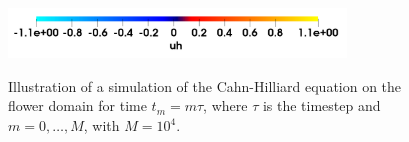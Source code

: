 \documentclass[11pt]{article}
\theoremstyle{remark}
\numberwithin{equation}{section}
\begin{document}
\begin{figure}[]
{    }\hfill
    \\
    \vspace{10pt}
    \hfill
    \hfill
    \hfill
    \vspace{10pt}
        \includegraphics[width=0.8\textwidth]{results/illustration/colobar.png}
        \caption{Illustration of a simulation of the Cahn-Hilliard equation on the flower domain for time $ t_{m} = m\tau $, where $\tau $ is the timestep and $m= 0,\ldots, M $, with $M = 10^4$.}
        \label{sub:fig:ill_flower}
\end{figure}
\end{document}
